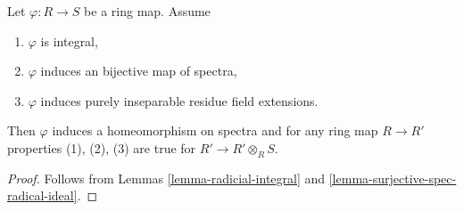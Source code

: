 \begin{lemma}
\label{lemma-radicial-integral-bijective}
Let $\varphi : R \to S$ be a ring map. Assume
\begin{enumerate}
\item $\varphi$ is integral,
\item $\varphi$ induces an bijective map of spectra,
\item $\varphi$ induces purely inseparable residue field extensions.
\end{enumerate}
Then $\varphi$ induces a homeomorphism on spectra and for any ring map
$R \to R'$ properties (1), (2), (3) are true for $R' \to R' \otimes_R S$.
\end{lemma}

\begin{proof}
Follows from Lemmas \ref{lemma-radicial-integral} and
\ref{lemma-surjective-spec-radical-ideal}.
\end{proof}
